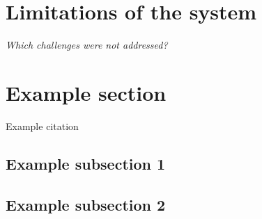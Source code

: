 \documentclass[11pt]{article}
\begin{document}
\begin{flushleft}
		\section{Limitations of the system}

		\textit{Which challenges were not addressed?}
		
		\section{Example section}
		
		Example citation \cite{neuman2009challenges}
		
		\subsection{Example subsection 1}
		
		\subsection{Example subsection 2}
		
		\newpage
		
		
		
		
		
		
	\end{flushleft}
	
\end{document}
